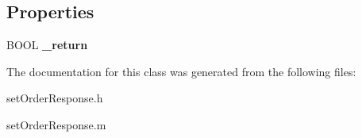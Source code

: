 \subsection*{Properties}
\begin{DoxyCompactItemize}
\item 
\hypertarget{interfaceset_order_response_a696458266b69a9794b0c9a9c2fc697ad}{}B\+O\+O\+L {\bfseries \+\_\+return}\label{interfaceset_order_response_a696458266b69a9794b0c9a9c2fc697ad}

\end{DoxyCompactItemize}


The documentation for this class was generated from the following files\+:\begin{DoxyCompactItemize}
\item 
set\+Order\+Response.\+h\item 
set\+Order\+Response.\+m\end{DoxyCompactItemize}
